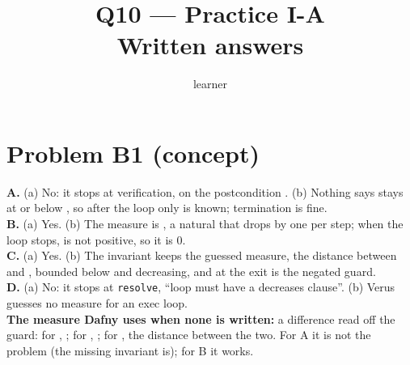 \documentclass[11pt]{article}
\title{Q10 --- Practice I-A \\ \large Written answers}
\author{learner}
\date{}
\begin{document}
\maketitle
\sloppy

\section*{Problem B1 (concept)}\label{ans:B1}
\begin{answer}
\textbf{A.} (a) No: it stops at verification, on the postcondition
. \quad (b) Nothing says  stays at or below ,
so after the loop only  is known; termination is fine. \\
\textbf{B.} (a) Yes. \quad (b) The measure is , a natural that drops
by one per step; when the loop stops,  is not positive, so it is 0. \\
\textbf{C.} (a) Yes. \quad (b) The invariant  keeps the guessed
measure, the distance between  and , bounded below and
decreasing, and at the exit  is the negated guard. \\
\textbf{D.} (a) No: it stops at \texttt{resolve}, ``loop must have a
decreases clause''. \quad (b) Verus guesses no measure for an exec loop. \\
\textbf{The measure Dafny uses when none is written:} a difference read off
the guard: for , ; for , ; for
, the distance between the two. For A it is not the problem (the
missing invariant is); for B it works.
\end{answer}

\end{document}
